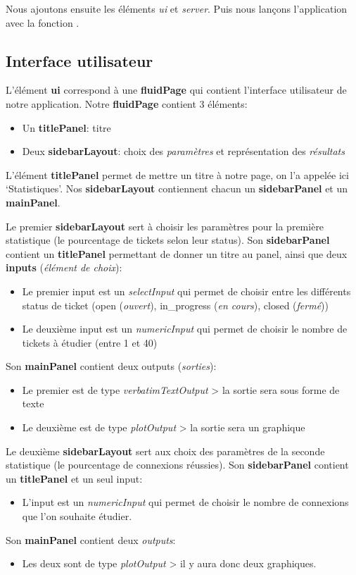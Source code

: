\documentclass[12pt, a4paper]{article}
\begin{document}
Nous ajoutons ensuite les éléments \textit{ui} et \textit{server}.
Puis nous lançons l'application avec la fonction .

\subsection*{Interface utilisateur}

L'élément \textbf{ui} correspond à une \textbf{fluidPage} qui contient l'interface utilisateur de notre application.
Notre \textbf{fluidPage} contient 3 éléments:
\begin{itemize}
    \item Un \textbf{titlePanel}: titre
    \item Deux \textbf{sidebarLayout}: choix des \textit{paramètres} et représentation des \textit{résultats}
\end{itemize}
L'élément \textbf{titlePanel} permet de mettre un titre à notre page, on l'a appelée ici `Statistiques'.
Nos \textbf{sidebarLayout} contiennent chacun un \textbf{sidebarPanel} et un \textbf{mainPanel}.
\bigskip

Le premier \textbf{sidebarLayout} sert à choisir les paramètres pour la première statistique (le pourcentage de tickets selon leur status).
Son \textbf{sidebarPanel} contient un \textbf{titlePanel} permettant de donner un titre au panel, ainsi que deux \textbf{inputs} (\textit{élément de choix}):
\begin{itemize}
    \item Le premier input est un \textit{selectInput} qui permet de choisir entre les différents status de ticket
    (open (\textit{ouvert}), in\_progress (\textit{en cours}), closed (\textit{fermé}))
    \item Le deuxième input est un \textit{numericInput} qui permet de choisir le nombre de tickets à étudier (entre 1 et 40)
\end{itemize}
Son \textbf{mainPanel} contient deux outputs (\textit{sorties}):
\begin{itemize}
    \item Le premier est de type \textit{verbatimTextOutput} > la sortie sera sous forme de texte
    \item Le deuxième est de type \textit{plotOutput} > la sortie sera un graphique
\end{itemize}
\bigskip

Le deuxième \textbf{sidebarLayout} sert aux choix des paramètres de la seconde statistique (le pourcentage de connexions réussies).
Son \textbf{sidebarPanel} contient un \textbf{titlePanel} et un seul input:
\begin{itemize}
    \item L'input est un \textit{numericInput}  qui permet de choisir le nombre de connexions que l'on souhaite étudier.
\end{itemize}
Son \textbf{mainPanel} contient deux \textit{outputs}:
\begin{itemize}
    \item Les deux sont de type \textit{plotOutput} > il y aura donc deux graphiques.
\end{itemize}
\end{document}
